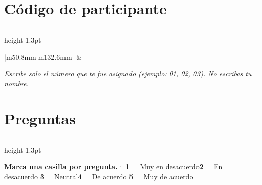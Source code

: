 \documentclass[11pt,a4paper]{article}
\newcommand{\seccion}[1]{%
  \section*{#1}%
  \vspace{-2.6mm}%
  {\color{dorado}\hrule height 1.3pt}%
  \vspace{2.2mm}%
}
\begin{document}
\seccion{C\'odigo de participante}

\begin{tabular}{|m{50.8mm}|m{132.6mm}|}
  \hline
   &
   \\[1.2mm]
  \hline
\end{tabular}

\vspace{1.3mm}
{\fontsize{7.1}{8.6}\selectfont\itshape\color{gris}%
 Escribe solo el n\'umero que te fue asignado (ejemplo: 01, 02, 03). No escribas tu nombre.\par}

\seccion{Preguntas}

\noindent
\begingroup
\setlength{\fboxsep}{0pt}
\colorbox{grisClaro}{%
  \begin{minipage}{\linewidth}
    \vspace{4pt}
    \hspace*{7pt}{\color{dorado}\rule[-1.2mm]{2.4pt}{5.4mm}}\hspace{2.5mm}%
    {\fontsize{7.8}{9.6}\selectfont\color{gris}%
     \textbf{Marca una casilla por pregunta.}\hspace{2mm}·\hspace{2mm}%
     \textbf{1} = Muy en desacuerdo\quad \textbf{2} = En desacuerdo\quad
     \textbf{3} = Neutral\quad \textbf{4} = De acuerdo\quad
     \textbf{5} = Muy de acuerdo\par}
    \vspace{4pt}
  \end{minipage}}
\endgroup
\par

\vspace{1.8mm}

\begingroup
\renewcommand{\arraystretch}{1.32}
\fontsize{9}{10.8}\selectfont
\end{document}
